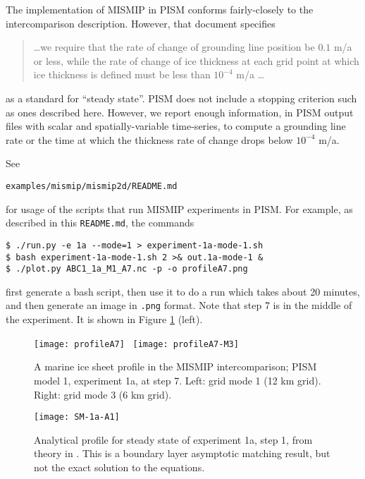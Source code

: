 The implementation of MISMIP in PISM conforms fairly-closely to the intercomparison description.  However, that document specifies
\begin{quotation}
\dots we require that the rate of change of grounding line position be $0.1$ m/a or less, while the rate of change of ice thickness at each grid point at which ice thickness is defined must be less than $10^{-4}$ m/a \dots
\end{quotation}
as a standard for ``steady state''. PISM does not include a stopping criterion such as ones described here. However, we report enough information, in PISM output files with scalar and spatially-variable time-series, to compute a grounding line rate or the time at which the thickness rate of change drops below $10^{-4}$ m/a.

See

  \centerline{\texttt{examples/mismip/mismip2d/README.md}}

\noindent for usage of the scripts that run MISMIP experiments in PISM.  For example, as described in this \texttt{README.md}, the commands

\begin{verbatim}
$ ./run.py -e 1a --mode=1 > experiment-1a-mode-1.sh
$ bash experiment-1a-mode-1.sh 2 >& out.1a-mode-1 &
$ ./plot.py ABC1_1a_M1_A7.nc -p -o profileA7.png
\end{verbatim}

\noindent first generate a bash script, then use it to do a run which takes about 20 minutes, and then generate an image in \texttt{.png} format.  Note that step 7 is in the middle of the experiment.  It is shown in Figure \ref{fig:MISMIPmodel1exper1aA7} (left).
 
\begin{figure}[ht]
\centering
\texttt{[image: profileA7]} \,
\texttt{[image: profileA7-M3]}
\caption{A marine ice sheet profile in the MISMIP intercomparison; PISM model 1, experiment 1a, at step 7.  Left: grid mode 1 (12 km grid).  Right: grid mode 3 (6 km grid).}
\label{fig:MISMIPmodel1exper1aA7}
\end{figure}

\begin{figure}[ht]
\centering
\texttt{[image: SM-1a-A1]}
\caption{Analytical profile for steady state of experiment 1a, step 1, from theory in \cite{SchoofMarine1}.  This is a boundary layer asymptotic matching result, but not the exact solution to the equations.}
\label{fig:SMexper1aM1A1}
\end{figure}


